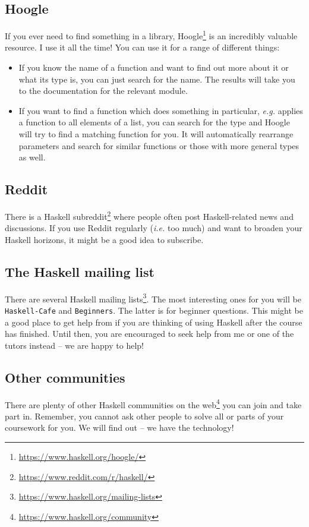 \subsection{Hoogle} 

If you ever need to find something in a library, Hoogle\footnote{\url{https://www.haskell.org/hoogle/}} is an incredibly valuable resource. I use it all the time! You can use it for a range of different things:
\begin{itemize}
\item If you know the name of a function and want to find out more about it or what its type is, you can just search for the name. The results will take you to the documentation for the relevant module.
\item If you want to find a function which does something in particular, \emph{e.g.} applies a function to all elements of a list, you can search for the type and Hoogle will try to find a matching function for you. It will automatically rearrange parameters and search for similar functions or those with more general types as well. 
\end{itemize}

\subsection{Reddit} 

There is a Haskell subreddit\footnote{\url{https://www.reddit.com/r/haskell/}} where people often post Haskell-related news and discussions. If you use Reddit regularly (\emph{i.e.} too much) and want to broaden your Haskell horizons, it might be a good idea to subscribe.

\subsection{The Haskell mailing list} 

There are several Haskell mailing lists\footnote{\url{https://www.haskell.org/mailing-lists}}. The most interesting ones for you will be \texttt{\small Haskell-Cafe} and \texttt{\small Beginners}. The latter is for beginner questions. This might be a good place to get help from if you are thinking of using Haskell after the course has finished. Until then, you are encouraged to seek help from me or one of the tutors instead -- we are happy to help! 

\subsection{Other communities} 

There are plenty of other Haskell communities on the web\footnote{\url{https://www.haskell.org/community}} you can join and take part in. Remember, you cannot ask other people to solve all or parts of your coursework for you. We will find out -- we have the technology!


